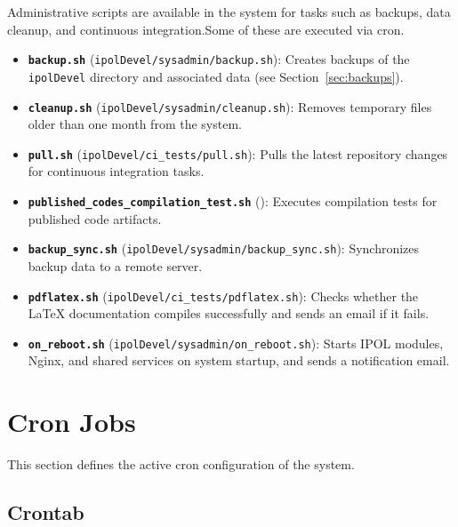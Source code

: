 \documentclass[a4paper,12pt]{article}
\begin{document}
Administrative scripts are available in the system for tasks such as backups, data cleanup, and continuous integration.Some of these are executed via cron.

\begin{itemize}

    \item \textbf{\texttt{backup.sh}} (\texttt{ipolDevel/sysadmin/backup.sh}): Creates backups of the \texttt{ipolDevel} directory and associated data (see Section~\ref{sec:backups}).

    \item \textbf{\texttt{cleanup.sh}} (\texttt{ipolDevel/sysadmin/cleanup.sh}): Removes temporary files older than one month from the system.

    \item \textbf{\texttt{pull.sh}} (\texttt{ipolDevel/ci\_tests/pull.sh}): Pulls the latest repository changes for continuous integration tasks.

    \item \textbf{\texttt{published\_codes\_compilation\_test.sh}} (): Executes compilation tests for published code artifacts.

    \item \textbf{\texttt{backup\_sync.sh}} (\texttt{ipolDevel/sysadmin/backup\_sync.sh}): Synchronizes backup data to a remote server.

    \item \textbf{\texttt{pdflatex.sh}} (\texttt{ipolDevel/ci\_tests/pdflatex.sh}): Checks whether the LaTeX documentation compiles successfully and sends an email if it fails.

    \item \textbf{\texttt{on\_reboot.sh}} (\texttt{ipolDevel/sysadmin/on\_reboot.sh}): Starts IPOL modules, Nginx, and shared services on system startup, and sends a notification email.

\end{itemize}


\section{Cron Jobs}

This section defines the active cron configuration of the system.

\subsection{Crontab}
\end{document}

